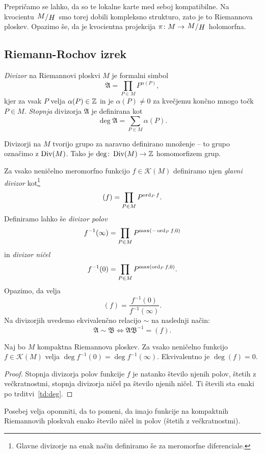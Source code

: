 Prepričamo se lahko, da so te lokalne karte med seboj kompatibilne.
Na kvocientu $\kvoc{M}{H}$ smo torej dobili kompleksno strukturo,
zato je to Riemannova ploskev. Opazimo še, da je kvocientna
projekcija $\pi \colon M \to \kvoc{M}{H}$ holomorfna.

\subsection{Riemann-Rochov izrek}

\begin{definicija}
\emph{Divizor} na Riemannovi ploskvi $M$ je formalni simbol
\[
\mathfrak{A} = \prod_{P \in M} P^{\alpha(P)},
\]
kjer za vsak $P$ velja $\alpha(P) \in \mathbb{Z}$ in je $\alpha(P) \ne 0$
za kvečjemu končno mnogo točk $P \in M$. \emph{Stopnja} divizorja
$\mathfrak{A}$ je definirana kot
\[
\deg \mathfrak{A} = \sum_{P \in M} \alpha(P).
\]
\end{definicija}

Divizorji na $M$ tvorijo grupo za naravno definirano množenje --
to grupo označimo z $\operatorname{Div}(M)$. Tako je
$\deg \colon \operatorname{Div}(M) \to \mathbb{Z}$ homomorfizem grup.

Za vsako neničelno meromorfno funkcijo $f \in \mathscr{K}(M)$
definiramo njen \emph{glavni divizor} kot\footnote{Glavne divizorje
na enak način definiramo še za meromorfne diferenciale.}
\[
(f) = \prod_{P \in M} P^{\operatorname{ord}_P f}.
\]
Definiramo lahko še \emph{divizor polov}
\[
f^{-1}(\infty) = \prod_{P \in M} P^{\max(-\operatorname{ord}_P f, 0)}
\]
in \emph{divizor ničel}
\[
f^{-1}(0) = \prod_{P \in M} P^{\max(\operatorname{ord}_P f, 0)}.
\]
Opazimo, da velja
\[
(f) = \frac{f^{-1}(0)}{f^{-1}(\infty)}.
\]
Na divizorjih uvedemo ekvivalenčno relacijo $\sim$ na naslednji način:
\[
\mathfrak{A} \sim \mathfrak{B} \iff
\mathfrak{A} \mathfrak{B}^{-1} = (f).
\]

\begin{lema}
Naj bo $M$ kompaktna Riemannova ploskev. Za vsako neničelno
funkcijo $f \in \mathscr{K}(M)$ velja
$\deg f^{-1}(0) = \deg f^{-1}(\infty)$. Ekvivalentno je
$\deg (f) = 0$.
\end{lema}

\begin{proof}
Stopnja divizorja polov funkcije $f$ je natanko število njenih
polov, štetih z večkratnostmi, stopnja divizorja ničel pa
število njenih ničel. Ti števili sta enaki po
trditvi~\ref{td:deg}.
\end{proof}

Posebej velja opomniti, da to pomeni, da imajo funkcije na
kompaktnih Riemannovih ploskvah enako število ničel in polov
(štetih z večkratnostmi).

